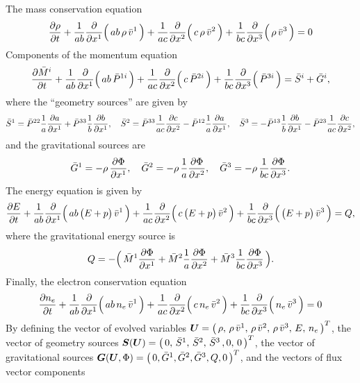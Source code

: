 \documentclass[10pt,preprint]{aastex}
\begin{document}
The mass conservation equation
\begin{equation}
  \frac{\partial \rho}{\partial t}
  +\frac{1}{ab}\frac{\partial }{\partial x^{1}}\Big(\,ab\,\rho\,\bar{v}^{1}\,\Big)
  +\frac{1}{ac}\frac{\partial }{\partial x^{2}}\Big(\,c\,\rho\,\bar{v}^{2}\,\Big)
  +\frac{1}{bc}\frac{\partial }{\partial x^{3}}\Big(\,\rho\,\bar{v}^{3}\,\Big)=0
\end{equation}
Components of the momentum equation
\begin{equation}
  \frac{\partial \bar{M}^{i}}{\partial t}
  +\frac{1}{ab}\frac{\partial }{\partial x^{1}}\Big(\,ab\,\bar{P}^{1i}\,\Big)
  +\frac{1}{ac}\frac{\partial }{\partial x^{2}}\Big(\,c\,\bar{P}^{2i}\,\Big)
  +\frac{1}{bc}\frac{\partial }{\partial x^{3}}\Big(\,\bar{P}^{3i}\,\Big)
  =\bar{S}^{i}+\bar{G}^{i},
\end{equation}
where the ``geometry sources'' are given by
\small
\begin{equation}
  \bar{S}^{1}
  =\bar{P}^{22}\frac{1}{a}\frac{\partial a}{\partial x^{1}}+\bar{P}^{33}\frac{1}{b}\frac{\partial b}{\partial x^{1}}, \quad
  \bar{S}^{2}
  =\bar{P}^{33}\frac{1}{ac}\frac{\partial c}{\partial x^{2}}-\bar{P}^{12}\frac{1}{a}\frac{\partial a}{\partial x^{1}}, \quad
  \bar{S}^{3}
  =-\bar{P}^{13}\frac{1}{b}\frac{\partial b}{\partial x^{1}}-\bar{P}^{23}\frac{1}{ac}\frac{\partial c}{\partial x^{2}},
\end{equation}
\normalsize
and the gravitational sources are
\begin{equation}
  \bar{G}^{1}
  =-\rho\,\frac{\partial \Phi}{\partial x^{1}}, \quad
  \bar{G}^{2}
  =-\rho\,\frac{1}{a}\frac{\partial \Phi}{\partial x^{2}}, \quad
  \bar{G}^{3}
  =-\rho\,\frac{1}{bc}\frac{\partial \Phi}{\partial x^{3}}.
\end{equation}
The energy equation is given by
\begin{equation}
  \frac{\partial E}{\partial t}
  +\frac{1}{ab}\frac{\partial }{\partial x^{1}}\Big(\,ab\,\big(E+p\big)\,\bar{v}^{1}\,\Big)
  +\frac{1}{ac}\frac{\partial }{\partial x^{2}}\Big(\,c\,\big(E+p\big)\,\bar{v}^{2}\,\Big)
  +\frac{1}{bc}\frac{\partial }{\partial x^{3}}\Big(\,\big(E+p\big)\,\bar{v}^{3}\,\Big)=Q,  
\end{equation}
where the gravitational energy source is
\begin{equation}
  Q=-\Big(\,\bar{M}^{1}\frac{\partial \Phi}{\partial x^{1}}+\bar{M}^{2}\frac{1}{a}\frac{\partial \Phi}{\partial x^{2}}+\bar{M}^{3}\frac{1}{bc}\frac{\partial \Phi}{\partial x^{3}}\,\Big).
\end{equation}
Finally, the electron conservation equation
\begin{equation}
  \frac{\partial n_{e}}{\partial t}
  +\frac{1}{ab}\frac{\partial }{\partial x^{1}}\Big(\,ab\,n_{e}\,\bar{v}^{1}\,\Big)
  +\frac{1}{ac}\frac{\partial }{\partial x^{2}}\Big(\,c\,n_{e}\,\bar{v}^{2}\,\Big)
  +\frac{1}{bc}\frac{\partial }{\partial x^{3}}\Big(\,n_{e}\,\bar{v}^{3}\,\Big)=0
\end{equation}
By defining the vector of evolved variables $\boldsymbol{U}=\big(\,\rho,\,\rho\,\bar{v}^{1},\,\rho\,\bar{v}^{2},\,\rho\,\bar{v}^{3},\,E,\,n_{e}\,\big)^{T}$, the vector of geometry sources $\boldsymbol{S}(\boldsymbol{U})=\big(\,0,\,\bar{S}^{1},\,\bar{S}^{2},\,\bar{S}^{3}\,,0,\,0\,\big)^{T}$, the vector of gravitational sources $\boldsymbol{G}(\boldsymbol{U},\Phi)=\big(\,0,\bar{G}^{1},\bar{G}^{2},\bar{G}^{3},Q,0\,\big)^{T}$, and the vectors of flux vector components
\end{document}
